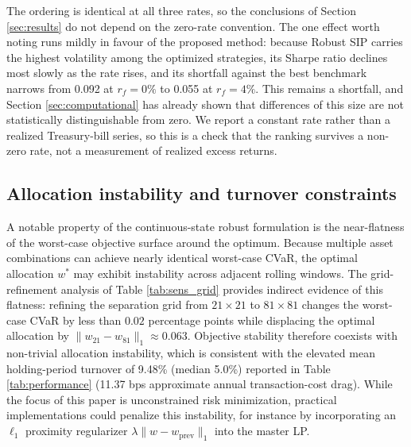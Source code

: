 \documentclass[smallcondensed]{svjour3}
\begin{document}
The ordering is identical at all three rates, so the conclusions of Section \ref{sec:results} do not depend on the zero-rate convention. The one effect worth noting runs mildly in favour of the proposed method: because Robust SIP carries the highest volatility among the optimized strategies, its Sharpe ratio declines most slowly as the rate rises, and its shortfall against the best benchmark narrows from 0.092 at $r_f = 0\%$ to 0.055 at $r_f = 4\%$. This remains a shortfall, and Section \ref{sec:computational} has already shown that differences of this size are not statistically distinguishable from zero. We report a constant rate rather than a realized Treasury-bill series, so this is a check that the ranking survives a non-zero rate, not a measurement of realized excess returns.

\subsection{Allocation instability and turnover constraints}
A notable property of the continuous-state robust formulation is the near-flatness of the worst-case objective surface around the optimum. Because multiple asset combinations can achieve nearly identical worst-case CVaR, the optimal allocation $w^*$ may exhibit instability across adjacent rolling windows. The grid-refinement analysis of Table \ref{tab:sens_grid} provides indirect evidence of this flatness: refining the separation grid from $21\times21$ to $81\times81$ changes the worst-case CVaR by less than $0.02$ percentage points while displacing the optimal allocation by $\|w_{21}-w_{81}\|_1 \approx 0.063$. Objective stability therefore coexists with non-trivial allocation instability, which is consistent with the elevated mean holding-period turnover of 9.48\% (median 5.0\%) reported in Table \ref{tab:performance} (11.37 bps approximate annual transaction-cost drag). While the focus of this paper is unconstrained risk minimization, practical implementations could penalize this instability, for instance by incorporating an $\ell_1$ proximity regularizer $\lambda \|w - w_{\mathrm{prev}}\|_1$ into the master LP.
\end{document}
